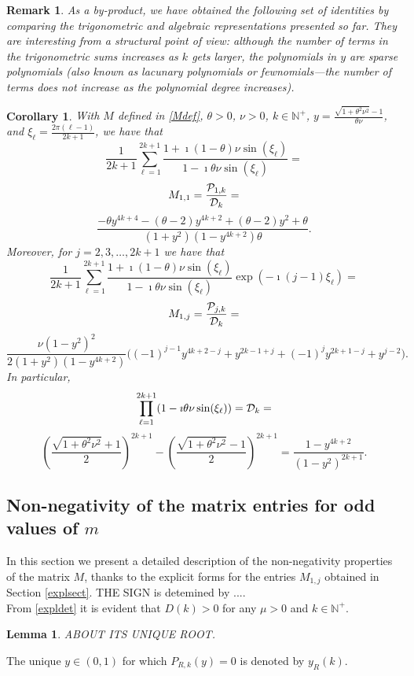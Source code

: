 \documentclass[a4paper]{article}
\newtheorem{lemma}{Lemma}
\newtheorem{remark}{Remark}
\newtheorem{corollary}{Corollary}
\newcommand{\te}{\theta}
\newcommand{\yr}{y_R(k)}
\newcommand{\nplus}{\mathbb{N}^+}
\newcommand{\Por}{P_{R,k}(y)}
\newcommand{\cP}{{\cal{P}}}
\newcommand{\cD}{{\cal{D}}}
\begin{document}
\begin{remark}
As a by-product, we have obtained the following set of identities by comparing the trigonometric and algebraic representations presented so far. They are interesting from a structural point of view: although the number of terms in the trigonometric sums increases as $k$ gets larger, the polynomials in $y$ are sparse polynomials (also known as lacunary polynomials or fewnomials---the number of terms does not increase as the polynomial degree increases).
\end{remark}
\begin{corollary}
With $M$ defined in \eqref{Mdef}, $\te>0$, $\nu>0$, $k\in\nplus$, $y=\frac{\sqrt{1+\te^2\nu^2}-1}{\te\nu}$, and $\xi_\ell  = \frac{2\pi(\ell-1)}{2k+1}$, we have that
\[
 \frac{1}{2k+1} \sum_{\ell=1}^{2k+1} \frac{1+\imath(1-\theta)\nu \sin(\xi_\ell)}{1-\imath\theta\nu  \sin(\xi_\ell)}=
\]
\[
M_{1,1}=\frac{\cP_{1,k}}{\cD_k}=
\]
\[
\frac{-\theta  y^{4 k+4}-(\theta -2) y^{4 k+2}+(\theta -2) y^2+\theta}{  \left(1+y^2\right)\left(1-y^{4 k+2}\right)\theta}.
\]
Moreover, for $j=2, 3, \ldots, 2k+1$ we have that
\[
\frac{1}{2k+1} \sum_{\ell=1}^{2k+1} \frac{1+\imath(1-\theta)\nu \sin(\xi_\ell)}{1-\imath\theta\nu \sin(\xi_\ell)}\exp\left(-\imath(j-1)\xi_\ell\right)=
\]
\[
M_{1,j}=\frac{\cP_{j,k}}{\cD_k}=
\]
\[
\frac{\nu  \left(1-y^2\right)^2 }{2 \left(1+y^2\right) \left(1-y^{4 k+2}\right)}\Big((-1)^{j-1} y^{4 k+2-j}+y^{2 k-1+j}+(-1)^j y^{2 k+1-j}+y^{j-2}\Big).
\]
In particular,
\[
\prod_{\ell=1}^{2k+1} (1-\imath\theta\nu \sin(\xi_\ell))=\cD_k=
\]
\[
\left(\frac{\sqrt{1+\te^2\nu^2}+1}{2}\right)^{2 k+1}- \left(\frac{\sqrt{1+\te^2\nu^2}-1}{2}\right)^{2 k+1}=
\frac{1-y^{4 k+2}}{\left(1-y^2\right)^{2 k+1} }.
\]


\end{corollary}

\subsection{Non-negativity of the matrix entries for odd values of $m$}\label{nonnegsect}

In this section we present a detailed description of the non-negativity properties of the matrix $M$, thanks to the explicit forms for the entries $M_{1,j}$ obtained in Section \ref{explsect}.
THE SIGN is detemined by ....\\

From \eqref{expldet} it is evident that $D(k)>0$ for any $\mu>0$ and $k\in\nplus$.

\begin{lemma}
ABOUT ITS UNIQUE ROOT.
\end{lemma}
The unique $y\in(0,1)$ for which $\Por=0$ is denoted by $\yr$. 
\end{document}
